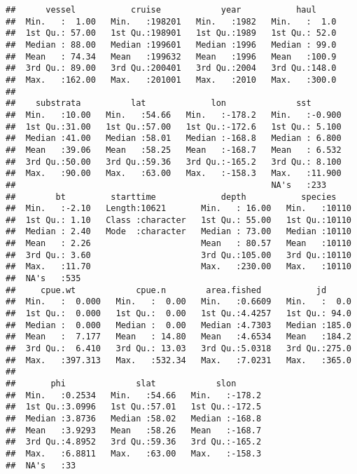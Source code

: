 \documentclass[
]{article}
\begin{document}
\begin{verbatim}
##      vessel           cruise            year           haul      
##  Min.   :  1.00   Min.   :198201   Min.   :1982   Min.   :  1.0  
##  1st Qu.: 57.00   1st Qu.:198901   1st Qu.:1989   1st Qu.: 52.0  
##  Median : 88.00   Median :199601   Median :1996   Median : 99.0  
##  Mean   : 74.34   Mean   :199632   Mean   :1996   Mean   :100.9  
##  3rd Qu.: 89.00   3rd Qu.:200401   3rd Qu.:2004   3rd Qu.:148.0  
##  Max.   :162.00   Max.   :201001   Max.   :2010   Max.   :300.0  
##                                                                  
##    substrata          lat             lon              sst        
##  Min.   :10.00   Min.   :54.66   Min.   :-178.2   Min.   :-0.900  
##  1st Qu.:31.00   1st Qu.:57.00   1st Qu.:-172.6   1st Qu.: 5.100  
##  Median :41.00   Median :58.01   Median :-168.8   Median : 6.800  
##  Mean   :39.06   Mean   :58.25   Mean   :-168.7   Mean   : 6.532  
##  3rd Qu.:50.00   3rd Qu.:59.36   3rd Qu.:-165.2   3rd Qu.: 8.100  
##  Max.   :90.00   Max.   :63.00   Max.   :-158.3   Max.   :11.900  
##                                                   NA's   :233     
##        bt         starttime             depth           species     
##  Min.   :-2.10   Length:10621       Min.   : 16.00   Min.   :10110  
##  1st Qu.: 1.10   Class :character   1st Qu.: 55.00   1st Qu.:10110  
##  Median : 2.40   Mode  :character   Median : 73.00   Median :10110  
##  Mean   : 2.26                      Mean   : 80.57   Mean   :10110  
##  3rd Qu.: 3.60                      3rd Qu.:105.00   3rd Qu.:10110  
##  Max.   :11.70                      Max.   :230.00   Max.   :10110  
##  NA's   :535                                                        
##     cpue.wt            cpue.n        area.fished           jd       
##  Min.   :  0.000   Min.   :  0.00   Min.   :0.6609   Min.   :  0.0  
##  1st Qu.:  0.000   1st Qu.:  0.00   1st Qu.:4.4257   1st Qu.: 94.0  
##  Median :  0.000   Median :  0.00   Median :4.7303   Median :185.0  
##  Mean   :  7.177   Mean   : 14.80   Mean   :4.6534   Mean   :184.2  
##  3rd Qu.:  6.410   3rd Qu.: 13.03   3rd Qu.:5.0318   3rd Qu.:275.0  
##  Max.   :397.313   Max.   :532.34   Max.   :7.0231   Max.   :365.0  
##                                                                     
##       phi              slat            slon       
##  Min.   :0.2534   Min.   :54.66   Min.   :-178.2  
##  1st Qu.:3.0996   1st Qu.:57.01   1st Qu.:-172.5  
##  Median :3.8736   Median :58.02   Median :-168.8  
##  Mean   :3.9293   Mean   :58.26   Mean   :-168.7  
##  3rd Qu.:4.8952   3rd Qu.:59.36   3rd Qu.:-165.2  
##  Max.   :6.8811   Max.   :63.00   Max.   :-158.3  
##  NA's   :33
\end{verbatim}
\end{document}
